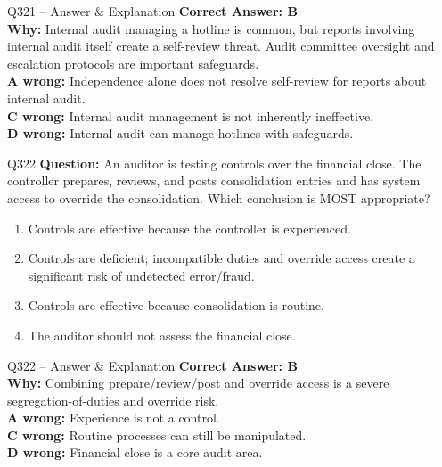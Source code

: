 \documentclass[aspectratio=169,10pt]{beamer}
\begin{document}
	\begin{frame}[t]{Q321 -- Answer \& Explanation}
		\small
		\textbf{Correct Answer: B} \\[4pt]
		\textbf{Why:} Internal audit managing a hotline is common, but reports involving internal audit itself create a self-review threat. Audit committee oversight and escalation protocols are important safeguards. \\[4pt]
		\textbf{A wrong:} Independence alone does not resolve self-review for reports about internal audit. \\[2pt]
		\textbf{C wrong:} Internal audit management is not inherently ineffective. \\[2pt]
		\textbf{D wrong:} Internal audit can manage hotlines with safeguards.
	\end{frame}
	
	\begin{frame}[t]{Q322}
		\small
		\textbf{Question:} An auditor is testing controls over the financial close. The controller prepares, reviews, and posts consolidation entries and has system access to override the consolidation. Which conclusion is MOST appropriate?
		\begin{enumerate}[label=\Alph*.,itemsep=1pt,topsep=2pt]
			\item Controls are effective because the controller is experienced.
			\item Controls are deficient; incompatible duties and override access create a significant risk of undetected error/fraud.
			\item Controls are effective because consolidation is routine.
			\item The auditor should not assess the financial close.
		\end{enumerate}
	\end{frame}
	
	\begin{frame}[t]{Q322 -- Answer \& Explanation}
		\small
		\textbf{Correct Answer: B} \\[4pt]
		\textbf{Why:} Combining prepare/review/post and override access is a severe segregation-of-duties and override risk. \\[4pt]
		\textbf{A wrong:} Experience is not a control. \\[2pt]
		\textbf{C wrong:} Routine processes can still be manipulated. \\[2pt]
		\textbf{D wrong:} Financial close is a core audit area.
	\end{frame}
	
\end{document}
